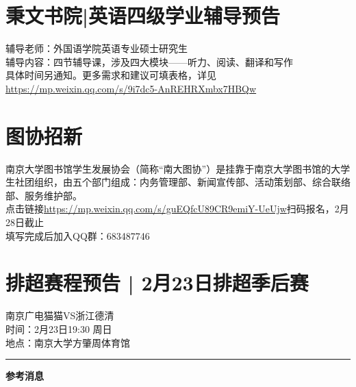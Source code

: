 \documentclass[letterpaper, 12pt]{article}
\begin{document}
\begin{multicols}{2}
\section{秉文书院|英语四级学业辅导预告}
辅导老师：外国语学院英语专业硕士研究生\\
辅导内容：四节辅导课，涉及四大模块——听力、阅读、翻译和写作\\
具体时间另通知。更多需求和建议可填表格，详见\url{https://mp.weixin.qq.com/s/9i7dc5-AnREHRXmbx7HBQw}

\section{图协招新}
南京大学图书馆学生发展协会（简称“南大图协”）是挂靠于南京大学图书馆的大学生社团组织，由五个部门组成：内务管理部、新闻宣传部、活动策划部、综合联络部、服务维护部。\\
点击链接\url{https://mp.weixin.qq.com/s/guEQfcU89CR9emiY-UeUjw}扫码报名，2月28日截止\\
填写完成后加入QQ群：683487746\\


\section{排超赛程预告 | 2月23日排超季后赛} 
南京广电猫猫VS浙江德清\\
时间：2月23日19:30 周日\\
地点：南京大学方肇周体育馆
\end{multicols} 
\hrule
\vspace{4mm}
\centerline{\huge\textbf{参考消息}}
\end{document}
